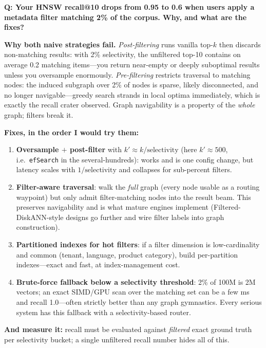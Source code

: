 \begin{interviewq}
\textbf{Q: Your HNSW recall@10 drops from 0.95 to 0.6 when users apply a metadata filter matching 2\% of the corpus. Why, and what are the fixes?}

 \quad {} \quad \badgefreq{\freqmed}

\stronganswer

\textbf{Why both naive strategies fail.} \emph{Post-filtering} runs vanilla top-$k$ then discards non-matching results: with 2\% selectivity, the unfiltered top-10 contains on average 0.2 matching items---you return near-empty or deeply suboptimal results unless you oversample enormously. \emph{Pre-filtering} restricts traversal to matching nodes: the induced subgraph over 2\% of nodes is sparse, likely disconnected, and no longer navigable---greedy search strands in local optima immediately, which is exactly the recall crater observed. Graph navigability is a property of the \emph{whole} graph; filters break it.

\textbf{Fixes, in the order I would try them:}
\begin{enumerate}
    \item \textbf{Oversample $+$ post-filter} with $k' \approx k/\text{selectivity}$ (here $k' \approx 500$, i.e.\ \texttt{efSearch} in the several-hundreds): works and is one config change, but latency scales with $1/\text{selectivity}$ and collapses for sub-percent filters.
    \item \textbf{Filter-aware traversal}: walk the \emph{full} graph (every node usable as a routing waypoint) but only admit filter-matching nodes into the result beam. This preserves navigability and is what mature engines implement (Filtered-DiskANN-style designs go further and wire filter labels into graph construction).
    \item \textbf{Partitioned indexes for hot filters}: if a filter dimension is low-cardinality and common (tenant, language, product category), build per-partition indexes---exact and fast, at index-management cost.
    \item \textbf{Brute-force fallback below a selectivity threshold}: 2\% of 100M is 2M vectors; an exact SIMD/GPU scan over the matching set can be a few ms and recall 1.0---often strictly better than any graph gymnastics. Every serious system has this fallback with a selectivity-based router.
\end{enumerate}

\textbf{And measure it:} recall must be evaluated against \emph{filtered} exact ground truth per selectivity bucket; a single unfiltered recall number hides all of this.


\end{interviewq}
